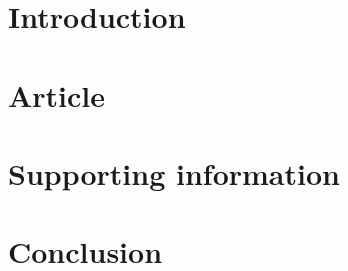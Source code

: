 \section{Introduction}

\section{Article}


\section{Supporting information}


\section{Conclusion}
